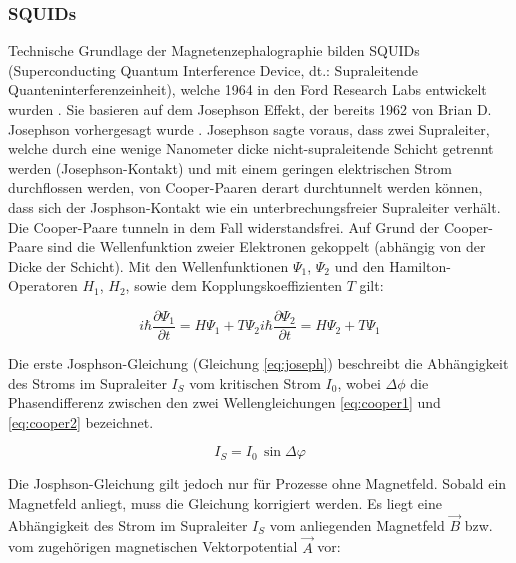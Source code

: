 \documentclass[doc,a4paper,12pt]{apa6}
\begin{document}
\subsubsection{SQUIDs}
\label{sec:squids}

Technische Grundlage der Magnetenzephalographie bilden SQUIDs (Superconducting Quantum Interference Device, dt.: Supraleitende Quanteninterferenzeinheit), welche 1964 in den Ford Research Labs entwickelt wurden \parencite{jaklevic1964quantum}. Sie basieren auf dem Josephson Effekt, der bereits 1962 von Brian D. Josephson vorhergesagt wurde \parencite{josephson1962possible}. Josephson sagte voraus, dass zwei Supraleiter, welche durch eine wenige Nanometer dicke nicht-supraleitende Schicht getrennt werden (Josephson-Kontakt) und mit einem geringen elektrischen Strom durchflossen werden, von Cooper-Paaren derart durchtunnelt werden können, dass sich der Josphson-Kontakt wie ein unterbrechungsfreier Supraleiter verhält. Die Cooper-Paare tunneln in dem Fall widerstandsfrei.
Auf Grund der Cooper-Paare sind die Wellenfunktion zweier Elektronen gekoppelt (abhängig von der Dicke der Schicht). Mit den Wellenfunktionen $\Psi_1$, $\Psi_2$ und den Hamilton-Operatoren $H_1$, $H_2$, sowie dem Kopplungskoeffizienten $T$ gilt:

\begin{subequations}
\label{eq:cooper}
  \begin{equation} i\hbar \frac{\partial \Psi_1}{\partial t} = H \Psi_1 + T \Psi_2 \label{eq:cooper1}\end{equation}
   \begin{equation} i\hbar \frac{\partial \Psi_2}{\partial t} = H \Psi_2 + T \Psi_1 \label{eq:cooper2}\end{equation}
\end{subequations}

Die erste Josphson-Gleichung (Gleichung \ref{eq:joseph}) beschreibt die Abhängigkeit des Stroms im Supraleiter $I_S$ vom kritischen Strom $I_0$, wobei $\Delta \phi$ die Phasendifferenz zwischen den zwei Wellengleichungen \ref{eq:cooper1} und \ref{eq:cooper2} bezeichnet.

\begin{equation}
\label{eq:joseph}
I_S = I_0\,\sin{\Delta \varphi}
\end{equation}

Die Josphson-Gleichung gilt jedoch nur für Prozesse ohne Magnetfeld. Sobald ein Magnetfeld anliegt, muss die Gleichung korrigiert werden. Es liegt eine Abhängigkeit des Strom im Supraleiter $I_S$ vom anliegenden Magnetfeld $\vec{B}$ bzw. vom zugehörigen magnetischen Vektorpotential $\vec{A}$ vor:
\end{document}

